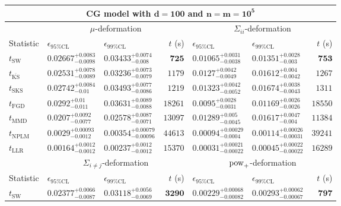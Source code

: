 \begin{tabular}{l|llr|llr}
	\toprule
	\multicolumn{7}{c}{{\bf CG model with $\mathbf{d=100}$ and $\mathbf{n=m=10^{5}}$}} \\
	\toprule
	\multicolumn{1}{c}{} & \multicolumn{3}{c}{$\mu$-deformation} & \multicolumn{3}{c}{$\Sigma_{ii}$-deformation} \\
	Statistic & $\epsilon_{95\%\mathrm{CL}}$ & $\epsilon_{99\%\mathrm{CL}}$ & $t$ (s) & $\epsilon_{95\%\mathrm{CL}}$ & $\epsilon_{99\%\mathrm{CL}}$ & $t$ (s) \\
	\midrule
	$t_{\mathrm{SW}}$ & $0.02667_{-0.0098}^{+0.0083}$ & $0.03433_{-0.008}^{+0.0074}$ & ${\mathbf{725}}$ & $0.01065_{-0.0038}^{+0.0031}$ & $0.01351_{-0.003}^{+0.0028}$ & ${\mathbf{753}}$ \\
	$t_{\overline{\mathrm{KS}}}$ & $0.02531_{-0.0089}^{+0.0078}$ & $0.03236_{-0.0079}^{+0.0073}$ & $1179$ & $0.0127_{-0.0049}^{+0.0042}$ & $0.01612_{-0.0042}^{+0.004}$ & $1267$ \\
	$t_{\mathrm{SKS}}$ & $0.02742_{-0.01}^{+0.0084}$ & $0.03493_{-0.0086}^{+0.0077}$ & $1219$ & $0.01323_{-0.0052}^{+0.0042}$ & $0.01674_{-0.0043}^{+0.0038}$ & $1311$ \\
	$t_{\mathrm{FGD}}$ & $0.0292_{-0.011}^{+0.01}$ & $0.03631_{-0.0088}^{+0.0089}$ & $18261$ & ${\mathbf{0.0095_{-0.0031}^{+0.0028}}}$ & ${\mathbf{0.01169_{-0.0026}^{+0.0026}}}$ & $18550$ \\
	$t_{\mathrm{MMD}}$ & ${\mathbf{0.0207_{-0.0077}^{+0.0092}}}$ & ${\mathbf{0.02578_{-0.0071}^{+0.0087}}}$ & $13097$ & $0.01289_{-0.0045}^{+0.005}$ & $0.01617_{-0.004}^{+0.0047}$ & $11384$ \\
\rowcolor{red!35}	$t_{\mathrm{NPLM}}$ & $0.0029_{-0.0012}^{+0.00093}$ & $0.00354_{-0.00096}^{+0.00079}$ & $44613$ & $0.00094_{-0.0004}^{+0.00029}$ & $0.00114_{-0.00031}^{+0.00026}$ & $39241$ \\
	$t_{\mathrm{LLR}}$ & $0.00164_{-0.0012}^{+0.0012}$ & $0.00237_{-0.0012}^{+0.0012}$ & $15370$ & $0.00031_{-0.00022}^{+0.00021}$ & $0.00045_{-0.00022}^{+0.00022}$ & $16289$ \\
	\toprule
	\multicolumn{1}{c}{} & \multicolumn{3}{c}{$\Sigma_{i\neq j}$-deformation} & \multicolumn{3}{c}{$\rm{pow}_{+}$-deformation} \\
	Statistic & $\epsilon_{95\%\mathrm{CL}}$ & $\epsilon_{99\%\mathrm{CL}}$ & $t$ (s) & $\epsilon_{95\%\mathrm{CL}}$ & $\epsilon_{99\%\mathrm{CL}}$ & $t$ (s) \\
	\midrule
	$t_{\mathrm{SW}}$ & $0.02377_{-0.0087}^{+0.0066}$ & $0.03118_{-0.0069}^{+0.0056}$ & ${\mathbf{3290}}$ & $0.00229_{-0.00082}^{+0.00068}$ & $0.00293_{-0.00067}^{+0.00062}$ & ${\mathbf{797}}$ \\

\end{tabular}
